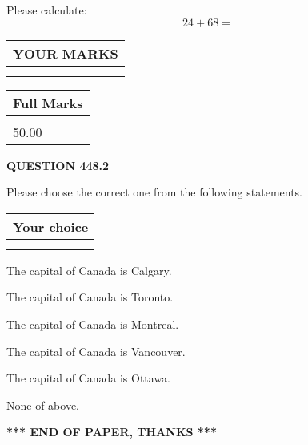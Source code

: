 \documentclass[12pt]{article}
\begin{document}
  
 
Please calculate:
\begin{equation}
24 +  %
68 = \nonumber
\end{equation}
 

 

 
  
\vspace{0.2in}
  
\noindent\begin{tabular}{|l|}
\hline
 YOUR MARKS  \\
\hline
 \\ 
 \\ 
\hline
\end{tabular}
\hspace{0.05in} \begin{tabular}{|l|}
\hline
 Full Marks  \\
\hline
 \\ 
50.00 \\
\hline
\end{tabular}
{\textbf{\Large{QUESTION
448.2 
}}}
  
  
Please choose the correct one from the following statements.
  
  
\noindent\hspace{3.0in} \begin{tabular}{|l|}
\hline
Your choice \\
\hline
 \\ 
 \\ 
\hline
\end{tabular}
  
  
 
 
The capital of Canada is Calgary.
 
 
The capital of Canada is Toronto.
 
 
The capital of Canada is Montreal.
 
 
The capital of Canada is Vancouver.
 
 
The capital of Canada is Ottawa.
 
 
 None of above.
 
 
   
   
 \vspace{0.2in}
 
   
   
   
   
\vspace{1.0in} 
{\textbf{\large{ *** END OF PAPER, THANKS *** }}} 
   
\end{document}
